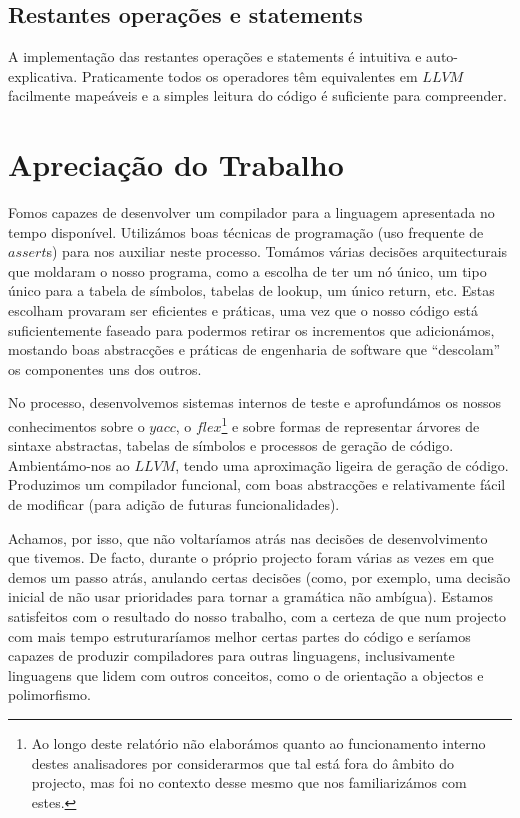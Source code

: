 \documentclass[11pt,a4paper]{article}
\begin{document}
\subsection{Restantes operações e statements}

A implementação das restantes operações e statements é intuitiva e auto-explicativa. Praticamente todos os operadores têm equivalentes em $LLVM$ facilmente mapeáveis e a simples leitura do código é suficiente para compreender.

\pagebreak

\section{Apreciação do Trabalho}

Fomos capazes de desenvolver um compilador para a linguagem apresentada no tempo disponível. Utilizámos boas técnicas de programação (uso frequente de $assert$s) para nos auxiliar neste processo. Tomámos várias decisões arquitecturais que moldaram o nosso programa, como a escolha de ter um nó único, um tipo único para a tabela de símbolos, tabelas de lookup, um único return, etc. Estas escolham provaram ser eficientes e práticas, uma vez que o nosso código está suficientemente faseado para podermos retirar os incrementos que adicionámos, mostando boas abstracções e práticas de engenharia de software que ``descolam'' os componentes uns dos outros.

No processo, desenvolvemos sistemas internos de teste e aprofundámos os nossos conhecimentos sobre o $yacc$, o $flex$\footnote{Ao longo deste relatório não elaborámos quanto ao funcionamento interno destes analisadores por considerarmos que tal está fora do âmbito do projecto, mas foi no contexto desse mesmo que nos familiarizámos com estes.} e sobre formas de representar árvores de sintaxe abstractas, tabelas de símbolos e processos de geração de código. Ambientámo-nos ao $LLVM$, tendo uma aproximação ligeira de geração de código. Produzimos um compilador funcional, com boas abstracções e relativamente fácil de modificar (para adição de futuras funcionalidades).

Achamos, por isso, que não voltaríamos atrás nas decisões de desenvolvimento que tivemos. De facto, durante o próprio projecto foram várias as vezes em que demos um passo atrás, anulando certas decisões (como, por exemplo, uma decisão inicial de não usar prioridades para tornar a gramática não ambígua). Estamos satisfeitos com o resultado do nosso trabalho, com a certeza de que num projecto com mais tempo estruturaríamos melhor certas partes do código e seríamos capazes de produzir compiladores para outras linguagens, inclusivamente linguagens que lidem com outros conceitos, como o de orientação a objectos e polimorfismo.
\end{document}
